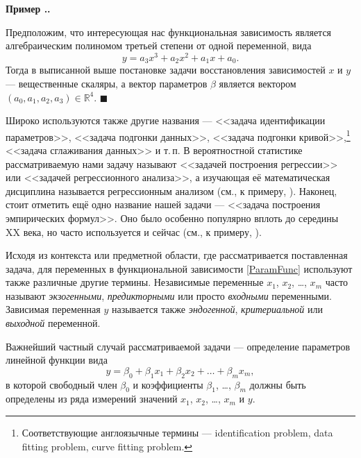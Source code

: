 \documentclass[a5paper,openany]{book}
\newcommand{\mbb}{\mathbb}
\newcounter{ExmpNum}[section]
\renewcommand{\theExmpNum}{\thesection.\arabic{ExmpNum}}
\newenvironment{example}%
  {\refstepcounter{ExmpNum}%
  \par\addvspace{\medskipamount} 
  \noindent\textbf{Пример {\theExmpNum}.}
  }%
  {\hfill$\blacksquare$\par\medskip}
\begin{document}
\begin{example} 
Предположим, что интересующая нас функциональная зависимость является алгебраическим 
полиномом третьей степени от одной переменной, вида 
\begin{equation*} 
y = a_{3}x^3 + a_{2}x^2 + a_{1}x + a_{0}. 
\end{equation*} 
Тогда в выписанной выше постановке задачи восстановления зависимостей $x$ и $y$ --- 
вещественные скаляры, а вектор параметров $\beta$ является вектором $(a_{0}, a_{1}, 
a_{2}, a_{3})\in\mbb{R}^4$. 
\end{example}
  
Широко используются также другие названия --- <<задача идентификации параметров>>,  
<<задача подгонки данных>>, <<задача подгонки кривой>>,\footnote{Соответствующие 
англоязычные термины --- identification problem, data fitting problem, curve fitting 
problem.} <<задача сглаживания данных>> и т.\,п. В вероятностной статистике 
рассматриваемую нами задачу называют <<задачей построения регрессии>> или <<задачей 
регрессионного анализа>>, а изучающая её математическая дисциплина называется 
регрессионным анализом (см., к примеру, \cite{DraperSmith,HCramer}). Наконец, стоит 
отметить ещё одно название нашей задачи --- <<задача построения эмпирических формул>>. 
Оно было особенно популярно вплоть до середины XX века, но часто используется и сейчас 
(см., к примеру, \cite{DemidMaronShuval}).  
  
%    
% 
  
Исходя из контекста или предметной области, где рассматривается поставленная задача, 
для переменных в функциональной зависимости \eqref{ParamFunc} используют также различные 
другие термины. Независимые переменные $x_1$, $x_2$, \ldots, $x_m$ часто называют 
\emph{экзогенными}, \emph{предикторными} или просто \emph{входными} переменными. 
Зависимая переменная $y$ называется также \emph{эндогенной}, \emph{критериальной} или 
\emph{выходной} переменной. 
%  
% 
%  
  
Важнейший частный случай рассматриваемой задачи --- определение параметров линейной 
функции вида 
\begin{equation} 
\label{LinFunc}
y = \beta_0 + \beta_1 x_1 + \beta_2 x_2 + \ldots + \beta_m x_m , 
\end{equation} 
в которой свободный член $\beta_0$ и коэффициенты $\beta_1$, \ldots, $\beta_m$ должны 
быть определены из ряда измерений значений $x_1$, $x_2$, \ldots, $x_m$ и $y$. 
  
\end{document}
